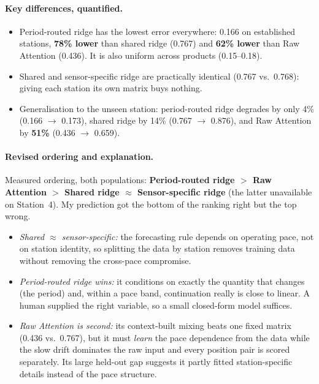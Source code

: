 \documentclass[11pt,a4paper]{article}
\begin{document}
\paragraph{Key differences, quantified.}
\begin{itemize}
  \item Period-routed ridge has the lowest error everywhere: 0.166 on established stations, \textbf{78\% lower} than shared ridge (0.767) and \textbf{62\% lower} than Raw Attention (0.436). It is also uniform across products (0.15--0.18).
  \item Shared and sensor-specific ridge are practically identical (0.767 vs.\ 0.768): giving each station its own matrix buys nothing.
  \item Generalisation to the unseen station: period-routed ridge degrades by only 4\% (0.166 $\to$ 0.173), shared ridge by 14\% (0.767 $\to$ 0.876), and Raw Attention by \textbf{51\%} (0.436 $\to$ 0.659).
\end{itemize}

\paragraph{Revised ordering and explanation.}
Measured ordering, both populations: \textbf{Period-routed ridge $>$ Raw Attention $>$ Shared ridge $\approx$ Sensor-specific ridge} (the latter unavailable on Station~4).
My prediction got the bottom of the ranking right but the top wrong.
\begin{itemize}
  \item \emph{Shared $\approx$ sensor-specific:} the forecasting rule depends on operating pace, not on station identity, so splitting the data by station removes training data without removing the cross-pace compromise.
  \item \emph{Period-routed ridge wins:} it conditions on exactly the quantity that changes (the period) and, within a pace band, continuation really is close to linear. A human supplied the right variable, so a small closed-form model suffices.
  \item \emph{Raw Attention is second:} its context-built mixing beats one fixed matrix (0.436 vs.\ 0.767), but it must \emph{learn} the pace dependence from the data while the slow drift dominates the raw input and every position pair is scored separately. Its large held-out gap suggests it partly fitted station-specific details instead of the pace structure.
\end{itemize}
\end{document}
